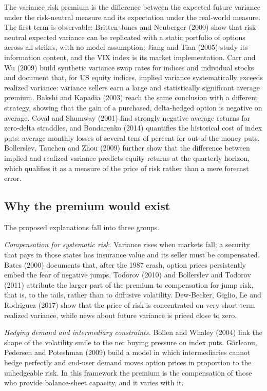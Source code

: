 \documentclass[11pt,a4paper]{article}
\begin{document}
The variance risk premium is the difference between the expected future variance under the risk-neutral measure and its expectation under the real-world measure. The first term is observable: Britten-Jones and Neuberger (2000) show that risk-neutral expected variance can be replicated with a static portfolio of options across all strikes, with no model assumption; Jiang and Tian (2005) study its information content, and the VIX index is its market implementation. Carr and Wu (2009) build synthetic variance swap rates for indices and individual stocks and document that, for US equity indices, implied variance systematically exceeds realized variance: variance sellers earn a large and statistically significant average premium. Bakshi and Kapadia (2003) reach the same conclusion with a different strategy, showing that the gain of a purchased, delta-hedged option is negative on average. Coval and Shumway (2001) find strongly negative average returns for zero-delta straddles, and Bondarenko (2014) quantifies the historical cost of index puts: average monthly losses of several tens of percent for out-of-the-money puts. Bollerslev, Tauchen and Zhou (2009) further show that the difference between implied and realized variance predicts equity returns at the quarterly horizon, which qualifies it as a measure of the price of risk rather than a mere forecast error.

\subsection{Why the premium would exist}

The proposed explanations fall into three groups.

\emph{Compensation for systematic risk.} Variance rises when markets fall; a security that pays in those states has insurance value and its seller must be compensated. Bates (2000) documents that, after the 1987 crash, option prices persistently embed the fear of negative jumps. Todorov (2010) and Bollerslev and Todorov (2011) attribute the larger part of the premium to compensation for jump risk, that is, to the tails, rather than to diffusive volatility. Dew-Becker, Giglio, Le and Rodriguez (2017) show that the price of risk is concentrated on very short-term realized variance, while news about future variance is priced close to zero.

\emph{Hedging demand and intermediary constraints.} Bollen and Whaley (2004) link the shape of the volatility smile to the net buying pressure on index puts. Gârleanu, Pedersen and Poteshman (2009) build a model in which intermediaries cannot hedge perfectly and end-user demand moves option prices in proportion to the unhedgeable risk. In this framework the premium is the compensation of those who provide balance-sheet capacity, and it varies with it.
\end{document}
